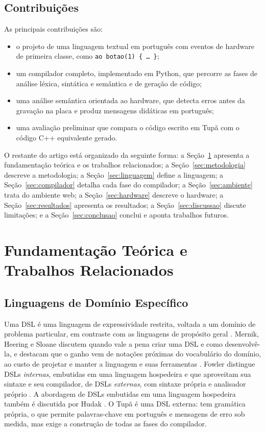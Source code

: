 \documentclass[conference]{IEEEtran}
\begin{document}
\subsection{Contribuições}
As principais contribuições são:
\begin{itemize}
\item o projeto de uma linguagem textual em português com eventos de
hardware de primeira classe, como \texttt{ao botao(1) \{ \ldots\ \}};
\item um compilador completo, implementado em Python, que percorre as fases
de análise léxica, sintática e semântica e de geração de código;
\item uma análise semântica orientada ao hardware, que detecta erros antes
da gravação na placa e produz mensagens didáticas em português;
\item uma avaliação preliminar que compara o código escrito em Tupã com o
código C++ equivalente gerado.
\end{itemize}

O restante do artigo está organizado da seguinte forma: a
Seção~\ref{sec:fundamentacao} apresenta a fundamentação teórica e os trabalhos
relacionados; a Seção~\ref{sec:metodologia} descreve a metodologia; a
Seção~\ref{sec:linguagem} define a linguagem; a Seção~\ref{sec:compilador}
detalha cada fase do compilador; a Seção~\ref{sec:ambiente} trata do ambiente
web; a Seção~\ref{sec:hardware} descreve o hardware; a
Seção~\ref{sec:resultados} apresenta os resultados; a
Seção~\ref{sec:discussao} discute limitações; e a Seção~\ref{sec:conclusao}
conclui e aponta trabalhos futuros.

\section{Fundamentação Teórica e Trabalhos Relacionados}\label{sec:fundamentacao}
\subsection{Linguagens de Domínio Específico}
Uma DSL é uma linguagem de expressividade restrita, voltada a um domínio de
problema particular, em contraste com as linguagens de propósito geral
\cite{mernik}. Mernik, Heering e Sloane discutem quando vale a pena criar uma
DSL e como desenvolvê-la, e destacam que o ganho vem de notações próximas do
vocabulário do domínio, ao custo de projetar e manter a linguagem e suas
ferramentas \cite{mernik}. Fowler distingue DSLs \emph{internas}, embutidas em
uma linguagem hospedeira e que aproveitam sua sintaxe e seu compilador, de
DSLs \emph{externas}, com sintaxe própria e analisador próprio
\cite{fowler}. A abordagem de DSLs embutidas em uma linguagem hospedeira
também é discutida por Hudak \cite{hudak}. O Tupã é uma DSL externa: tem
gramática própria, o que permite palavras-chave em português e mensagens de
erro sob medida, mas exige a construção de todas as fases do compilador.
\end{document}
